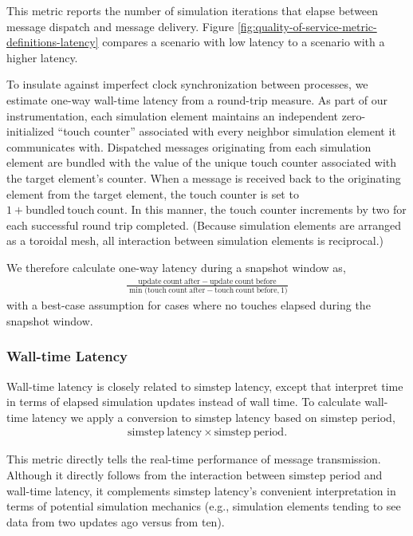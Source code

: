 This metric reports the number of simulation iterations that elapse between message dispatch and message delivery.
Figure \ref{fig:quality-of-service-metric-definitions-latency} compares a scenario with low latency to a scenario with a higher latency.

To insulate against imperfect clock synchronization between processes, we estimate one-way wall-time latency from a round-trip measure.
As part of our instrumentation, each simulation element maintains an independent zero-initialized ``touch counter'' associated with every neighbor simulation element it communicates with.
Dispatched messages originating from each simulation element are bundled with the value of the unique touch counter associated with the target element's counter.
When a message is received back to the originating element from the target element, the touch counter is set to $1 + \mathrm{bundled\ touch\ count}$.
In this manner, the touch counter increments by two for each successful round trip completed.
(Because simulation elements are arranged as a toroidal mesh, all interaction between simulation elements is reciprocal.)

We therefore calculate one-way latency during a snapshot window as,
\begin{align*}
  \frac{
    \mathrm{update\ count\ after} - \mathrm{update\ count\ before}
  }{
    \min\Big( \mathrm{ touch\ count\ after } - \mathrm{ touch\ count\ before }, 1 \Big)
  }
\end{align*}
with a best-case assumption for cases where no touches elapsed during the snapshot window.


\subsubsection{Wall-time Latency} \label{sec:simulation-time-latency-metric}

Wall-time latency is closely related to simstep latency, except that interpret time in terms of elapsed simulation updates instead of wall time.
To calculate wall-time latency we apply a conversion to simstep latency based on simstep period,
\begin{align*}
  \mathrm{simstep\ latency} \times \mathrm{simstep\ period}.
\end{align*}

This metric directly tells the real-time performance of message transmission.
Although it directly follows from the interaction between simstep period and wall-time latency, it complements simstep latency's convenient interpretation in terms of potential simulation mechanics (e.g., simulation elements tending to see data from two updates ago versus from ten).


